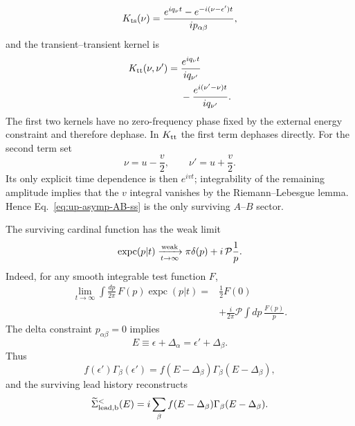 \documentclass[
 reprint,
 superscriptaddress,
 amsmath,amssymb,
 aps,prb,
 longbibliography,
 floatfix
]{revtex4-2}
\newcommand{\expc}{\operatorname{expc}}
\begin{document}
\begin{equation*}
K_{\rm ts}(\nu)
=
\frac{
 e^{iq_\nu t}
 -e^{-i(\nu-\epsilon')t}}
{i p_{\alpha\beta}},
\end{equation*}
and the transient--transient kernel is
\begin{equation*}
\begin{aligned}
K_{\rm tt}(\nu,\nu')
={}&
\frac{e^{iq_\nu t}}
{i q_{\nu'}}
\\
&-
\frac{e^{i(\nu'-\nu)t}}
{i q_{\nu'}}.
\end{aligned}
\end{equation*}
The first two kernels have no zero-frequency phase fixed by the external energy constraint and therefore dephase. In $K_{\rm tt}$ the first term dephases directly. For the second term set
\begin{equation*}
\nu=u-\frac{v}{2},
\qquad
\nu'=u+\frac{v}{2}.
\end{equation*}
Its only explicit time dependence is then $e^{ivt}$; integrability of the remaining amplitude implies that the $v$ integral vanishes by the Riemann--Lebesgue lemma. Hence Eq.~\eqref{eq:up-asymp-AB-ss} is the only surviving $A$--$B$ sector.

The surviving cardinal function has the weak limit
\begin{equation}
\expc(p|t)
\xrightarrow[t\to\infty]{\rm weak}
\pi\delta(p)
+i\,\mathcal P\frac{1}{p}.
\label{eq:up-asymp-expc}
\end{equation}
Indeed, for any smooth integrable test function $F$,
\begin{equation*}
\begin{aligned}
\lim_{t\to\infty}
\int\frac{dp}{2\pi}\,
F(p)\expc(p|t)
={}&
\frac12F(0)
\\
&+
\frac{i}{2\pi}
\mathcal P\int dp\,
\frac{F(p)}{p}.
\end{aligned}
\end{equation*}
The delta constraint $p_{\alpha\beta}=0$ implies
\begin{equation*}
E
\equiv
\epsilon+\Delta_\alpha
=
\epsilon'+\Delta_\beta.
\end{equation*}
Thus
\begin{equation*}
f(\epsilon')\Gamma_\beta(\epsilon')
=
f(E-\Delta_\beta)
\Gamma_\beta(E-\Delta_\beta),
\end{equation*}
and the surviving lead history reconstructs
\begin{equation}
\widetilde\Sigma_{\rm lead,b}^{<}(E)
=
 i\sum_\beta
 f(E-\Delta_\beta)
 \Gamma_\beta(E-\Delta_\beta).
\label{eq:up-asymp-lead-lesser}
\end{equation}
\end{document}
